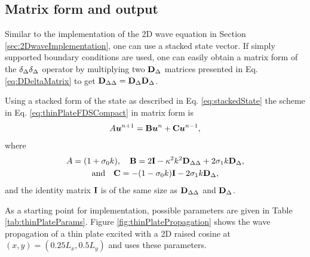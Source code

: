 \subsection{Matrix form and output}
Similar to the implementation of the 2D wave equation in Section \ref{sec:2DwaveImplementation}, one can use a stacked state vector. If simply supported boundary conditions are used, one can easily obtain a matrix form of the $\delta_{\Delta}\delta_{\Delta}$ operator by multiplying two $\mathbf{D}_\Delta$ matrices presented in Eq. \eqref{eq:DDeltaMatrix} to get $\mathbf{D}_{\Delta\Delta} = \mathbf{D}_\Delta\mathbf{D}_\Delta$.

Using a stacked form of the state as described in Eq. \eqref{eq:stackedState} the scheme in Eq. \eqref{eq:thinPlateFDSCompact} in matrix form is     
\begin{equation}\label{eq:matrixFormThinPlate}
    A\boldsymbol{u}^{n+1} = \mathbf{B}\boldsymbol{u}^n + \mathbf{C}\boldsymbol{u}^{n-1},
\end{equation}
where
\begin{gather*}
    A = (1+\sigma_{0} k),\quad \mathbf{B} = 2\mathbf{I} - \kappa^2 k^2 \mathbf{D}_{\Delta\Delta} + 2 \sigma_{1} k\mathbf{D}_\Delta, \\
    \text{and}\quad \mathbf{C} = -(1-\sigma_{0} k)\mathbf{I} - 2\sigma_{1} k \mathbf{D}_\Delta,
\end{gather*}
and the identity matrix $\mathbf{I}$ is of the same size as $\mathbf{D}_{\Delta\Delta}$ and $\mathbf{D}_\Delta$.

As a starting point for implementation, possible parameters are given in Table \ref{tab:thinPlateParams}. Figure \ref{fig:thinPlatePropagation} shows the wave propagation of a thin plate excited with a 2D raised cosine at $(x,y) = (0.25L_x, 0.5L_y)$ and uses these parameters.

